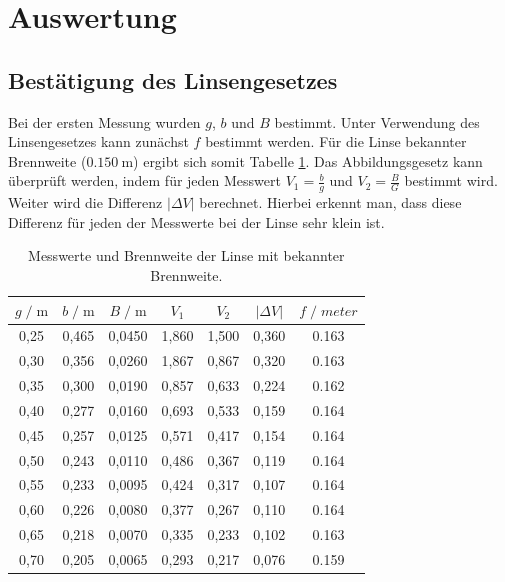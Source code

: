 \section{Auswertung}
\label{sec:Auswertung}

\subsection{Bestätigung des Linsengesetzes}

Bei der ersten Messung wurden $g$, $b$ und $B$ bestimmt. Unter Verwendung des Linsengesetzes 
kann zunächst $f$ bestimmt werden. Für die Linse bekannter
Brennweite ($\SI{0.150}{\meter}$) ergibt sich somit Tabelle \ref{tab:mess1}. Das Abbildungsgesetz 
kann überprüft werden, indem für jeden Messwert $V_1 = \frac{b}{g}$ und $V_2= \frac{B}{G}$
bestimmt wird. Weiter wird die Differenz $\vert\Delta V \vert$ berechnet. Hierbei erkennt 
man, dass diese Differenz für jeden der Messwerte bei der Linse sehr klein ist.\\

\begin{table}
    \centering
    \caption{Messwerte und Brennweite der Linse mit bekannter Brennweite.}
    \label{tab:mess1}
    \begin{tabular}{c c c c c c c}
    \toprule
    $ g \;/\; \si{\meter} $ & $b \;/\; \si{\meter}$ &
    $ B \;/\; \si{\meter} $ & $V_1$ & $V_2$ & $\vert \Delta V \vert$ & $f \;/\; \si{meter}$\\
    \midrule 
        0,25 & 0,465 & 0,0450 & 1,860 & 1,500 & 0,360 & 0.163\\
        0,30 & 0,356 & 0,0260 & 1,867 & 0,867 & 0,320 & 0.163\\
        0,35 & 0,300 & 0,0190 & 0,857 & 0,633 & 0,224 & 0.162\\
        0,40 & 0,277 & 0,0160 & 0,693 & 0,533 & 0,159 & 0.164\\
        0,45 & 0,257 & 0,0125 & 0,571 & 0,417 & 0,154 & 0.164\\
        0,50 & 0,243 & 0,0110 & 0,486 & 0,367 & 0,119 & 0.164\\
        0,55 & 0,233 & 0,0095 & 0,424 & 0,317 & 0,107 & 0.164\\
        0,60 & 0,226 & 0,0080 & 0,377 & 0,267 & 0,110 & 0.164\\
        0,65 & 0,218 & 0,0070 & 0,335 & 0,233 & 0,102 & 0.163\\
        0,70 & 0,205 & 0,0065 & 0,293 & 0,217 & 0,076 & 0.159\\          
    \bottomrule
    \end{tabular}
    \end{table}


